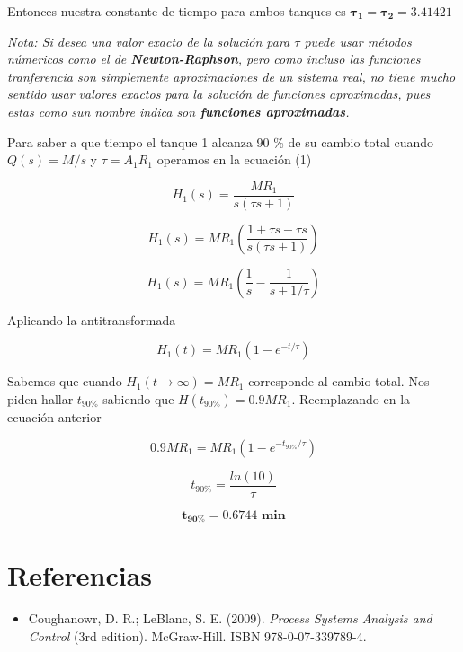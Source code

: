 \documentclass[
  letterpaper,
  DIV=11,
  numbers=noendperiod]{scrreprt}
\providecommand{\tightlist}{%
  \setlength{\itemsep}{0pt}\setlength{\parskip}{0pt}}\usepackage{longtable,booktabs,array}
\begin{document}
Entonces nuestra constante de tiempo para ambos tanques es
\(\mathbf{\tau_1=\tau_2=3.41421}\)

\emph{Nota: Si desea una valor exacto de la solución para \(\tau\) puede
usar métodos númericos como el de \textbf{Newton-Raphson}, pero como
incluso las funciones tranferencia son simplemente aproximaciones de un
sistema real, no tiene mucho sentido usar valores exactos para la
solución de funciones aproximadas, pues estas como sun nombre indica son
\textbf{funciones aproximadas}.}

Para saber a que tiempo el tanque 1 alcanza 90 \% de su cambio total
cuando \(Q(s) = M/s\) y \(\tau = A_1R_1\) operamos en la ecuación (1)

\[
H_1(s)=\frac{MR_1}{s(\tau s +1)}
\]

\[
H_1(s)=MR_1\left(\frac{1+\tau s - \tau s}{s(\tau s +1)}\right)
\]

\[
H_1(s)=MR_1\left(\frac{1}{s}-\frac{1}{s+1/\tau}\right)
\]

Aplicando la antitransformada

\[
H_1(t)=MR_1\left(1-e^{-t/\tau}\right)
\]

Sabemos que cuando \(H_1(t\to\infty)=MR_1\) corresponde al cambio total.
Nos piden hallar \(t_{90\%}\) sabiendo que \(H(t_{90\%})= 0.9MR_1\).
Reemplazando en la ecuación anterior

\[
0.9MR_1=MR_1\left(1-e^{-t_{90\%}/\tau}\right)
\]

\[
t_{90\%}=\frac{ln(10)}{\tau}
\]

\[
\mathbf{t_{90\%}=0.6744 \textbf{ min}}
\]

\hypertarget{referencias-12}{%
\section{Referencias}\label{referencias-12}}

\begin{itemize}
\tightlist
\item
  Coughanowr, D. R.; LeBlanc, S. E. (2009). \emph{Process Systems
  Analysis and Control} (3rd edition). McGraw-Hill. ISBN
  978-0-07-339789-4.
\end{itemize}
\end{document}
